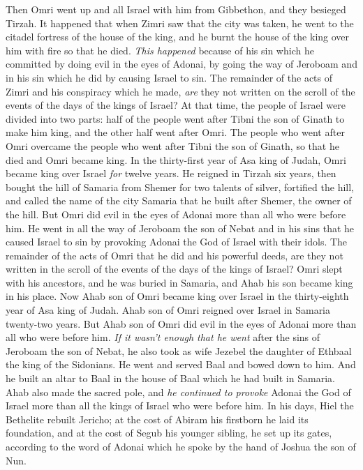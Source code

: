 \begin{biblechapter}
\verse Then Omri went up and all Israel with him from Gibbethon, and they besieged Tirzah.
\verse It happened that when Zimri saw that the city was taken, he went to the citadel fortress of the house of the king, and he burnt the house of the king over him with fire so that he died.
\verse \textit{This happened} because of his sin which he committed by doing evil in the eyes of Adonai, by going the way of Jeroboam and in his sin which he did by causing Israel to sin.
\verse The remainder of the acts of Zimri and his conspiracy which he made, \textit{are} they not written on the scroll of the events of the days of the kings of Israel?
 At that time, the people of Israel were divided into two parts: half of the people went after Tibni the son of Ginath to make him king, and the other half went after Omri.
\verse The people who went after Omri overcame the people who went after Tibni the son of Ginath, so that he died and Omri became king.
\verse In the thirty-first year of Asa king of Judah, Omri became king over Israel \textit{for} twelve years. He reigned in Tirzah six years,
\verse then bought the hill of Samaria from Shemer for two talents of silver, fortified the hill, and called the name of the city Samaria that he built after Shemer, the owner of the hill.
\verse But Omri did evil in the eyes of Adonai more than all who were before him.
\verse He went in all the way of Jeroboam the son of Nebat and in his sins that he caused Israel to sin by provoking Adonai the God of Israel with their idols.
\verse The remainder of the acts of Omri that he did and his powerful deeds, are they not written in the scroll of the events of the days of the kings of Israel?
\verse Omri slept with his ancestors, and he was buried in Samaria, and Ahab his son became king in his place.
 Now Ahab son of Omri became king over Israel in the thirty-eighth year of Asa king of Judah. Ahab son of Omri reigned over Israel in Samaria twenty-two years.
\verse But Ahab son of Omri did evil in the eyes of Adonai more than all who were before him.
\verse \textit{If it wasn’t enough that he went} after the sins of Jeroboam the son of Nebat, he also took as wife Jezebel the daughter of Ethbaal the king of the Sidonians. He went and served Baal and bowed down to him.
\verse And he built an altar to Baal in the house of Baal which he had built in Samaria.
\verse Ahab also made the sacred pole, and \textit{he continued to provoke} Adonai the God of Israel more than all the kings of Israel who were before him.
\verse In his days, Hiel the Bethelite rebuilt Jericho; at the cost of Abiram his firstborn he laid its foundation, and at the cost of Segub his younger sibling, he set up its gates, according to the word of Adonai which he spoke by the hand of Joshua the son of Nun.
\end{biblechapter}

